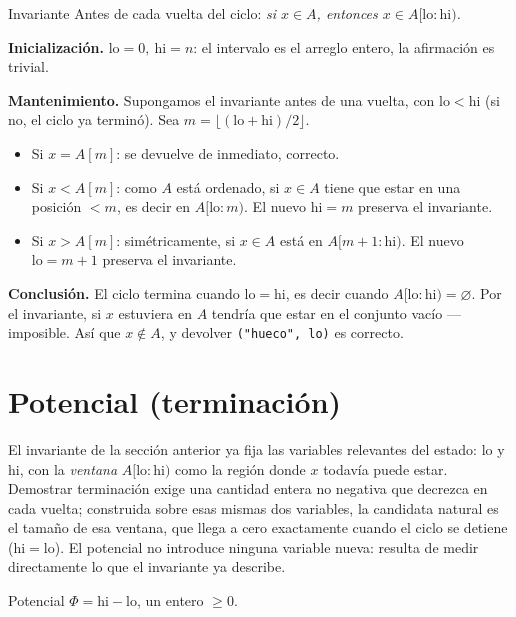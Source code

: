 \documentclass[11pt]{article}
\begin{document}
\begin{resultado}{Invariante}
Antes de cada vuelta del ciclo: \emph{si $x\in A$, entonces $x\in A[\mathrm{lo}:\mathrm{hi})$.}
\end{resultado}

\textbf{Inicialización.} $\mathrm{lo}=0,\ \mathrm{hi}=n$: el intervalo es el arreglo entero, la afirmación
es trivial.

\textbf{Mantenimiento.} Supongamos el invariante antes de una vuelta, con $\mathrm{lo}<\mathrm{hi}$ (si no,
el ciclo ya terminó). Sea $m=\lfloor(\mathrm{lo}+\mathrm{hi})/2\rfloor$.
\begin{itemize}
\item Si $x=A[m]$: se devuelve de inmediato, correcto.
\item Si $x<A[m]$: como $A$ está ordenado, si $x\in A$ tiene que estar en una posición $<m$, es decir en
$A[\mathrm{lo}:m)$. El nuevo $\mathrm{hi}=m$ preserva el invariante.
\item Si $x>A[m]$: simétricamente, si $x\in A$ está en $A[m{+}1:\mathrm{hi})$. El nuevo $\mathrm{lo}=m{+}1$
preserva el invariante.
\end{itemize}

\textbf{Conclusión.} El ciclo termina cuando $\mathrm{lo}=\mathrm{hi}$, es decir cuando $A[\mathrm{lo}:\mathrm{hi})=\varnothing$.
Por el invariante, si $x$ estuviera en $A$ tendría que estar en el conjunto vacío --- imposible. Así que
$x\notin A$, y devolver \texttt{("hueco", lo)} es correcto.

\section{Potencial (terminación)}

El invariante de la sección anterior ya fija las variables relevantes del estado: $\mathrm{lo}$ y
$\mathrm{hi}$, con la \emph{ventana} $A[\mathrm{lo}:\mathrm{hi})$ como la región donde $x$ todavía puede
estar. Demostrar terminación exige una cantidad entera no negativa que decrezca en cada vuelta; construida
sobre esas mismas dos variables, la candidata natural es el tamaño de esa ventana, que llega a cero
exactamente cuando el ciclo se detiene ($\mathrm{hi}=\mathrm{lo}$). El potencial no introduce ninguna
variable nueva: resulta de medir directamente lo que el invariante ya describe.

\begin{resultado}{Potencial}
$\Phi = \mathrm{hi}-\mathrm{lo}$, un entero $\geq 0$.
\end{resultado}
\end{document}
